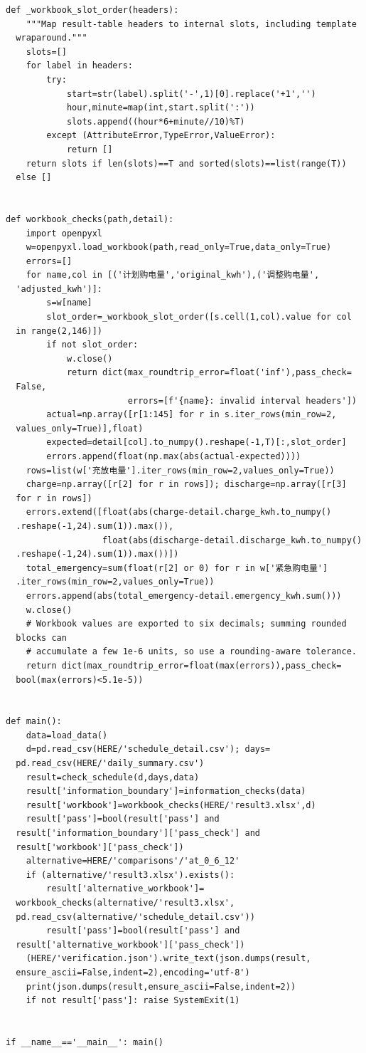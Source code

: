 \begin{verbatim}
def _workbook_slot_order(headers):
    """Map result-table headers to internal slots, including template
  wraparound."""
    slots=[]
    for label in headers:
        try:
            start=str(label).split('-',1)[0].replace('+1','')
            hour,minute=map(int,start.split(':'))
            slots.append((hour*6+minute//10)%T)
        except (AttributeError,TypeError,ValueError):
            return []
    return slots if len(slots)==T and sorted(slots)==list(range(T))
  else []


def workbook_checks(path,detail):
    import openpyxl
    w=openpyxl.load_workbook(path,read_only=True,data_only=True)
    errors=[]
    for name,col in [('计划购电量','original_kwh'),('调整购电量',
  'adjusted_kwh')]:
        s=w[name]
        slot_order=_workbook_slot_order([s.cell(1,col).value for col
  in range(2,146)])
        if not slot_order:
            w.close()
            return dict(max_roundtrip_error=float('inf'),pass_check=
  False,
                        errors=[f'{name}: invalid interval headers'])
        actual=np.array([r[1:145] for r in s.iter_rows(min_row=2,
  values_only=True)],float)
        expected=detail[col].to_numpy().reshape(-1,T)[:,slot_order]
        errors.append(float(np.max(abs(actual-expected))))
    rows=list(w['充放电量'].iter_rows(min_row=2,values_only=True))
    charge=np.array([r[2] for r in rows]); discharge=np.array([r[3]
  for r in rows])
    errors.extend([float(abs(charge-detail.charge_kwh.to_numpy()
  .reshape(-1,24).sum(1)).max()),
                   float(abs(discharge-detail.discharge_kwh.to_numpy()
  .reshape(-1,24).sum(1)).max())])
    total_emergency=sum(float(r[2] or 0) for r in w['紧急购电量']
  .iter_rows(min_row=2,values_only=True))
    errors.append(abs(total_emergency-detail.emergency_kwh.sum()))
    w.close()
    # Workbook values are exported to six decimals; summing rounded
  blocks can
    # accumulate a few 1e-6 units, so use a rounding-aware tolerance.
    return dict(max_roundtrip_error=float(max(errors)),pass_check=
  bool(max(errors)<5.1e-5))


def main():
    data=load_data()
    d=pd.read_csv(HERE/'schedule_detail.csv'); days=
  pd.read_csv(HERE/'daily_summary.csv')
    result=check_schedule(d,days,data)
    result['information_boundary']=information_checks(data)
    result['workbook']=workbook_checks(HERE/'result3.xlsx',d)
    result['pass']=bool(result['pass'] and
  result['information_boundary']['pass_check'] and
  result['workbook']['pass_check'])
    alternative=HERE/'comparisons'/'at_0_6_12'
    if (alternative/'result3.xlsx').exists():
        result['alternative_workbook']=
  workbook_checks(alternative/'result3.xlsx',
  pd.read_csv(alternative/'schedule_detail.csv'))
        result['pass']=bool(result['pass'] and
  result['alternative_workbook']['pass_check'])
    (HERE/'verification.json').write_text(json.dumps(result,
  ensure_ascii=False,indent=2),encoding='utf-8')
    print(json.dumps(result,ensure_ascii=False,indent=2))
    if not result['pass']: raise SystemExit(1)


if __name__=='__main__': main()
\end{verbatim}

